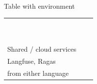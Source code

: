 \begin{simpleCenteringTempChapterTable}{Table with environment}
	\def\cellSharedA{Shared / cloud services}
	\def\cellSharedB{\makecell[l]{OpenAI, Anthropic, Promptfoo, \\ Langfuse, Ragas }}
	\def\cellSharedC{\makecell[l]{Same; consumed via HTTP/SDKs \\  from either language }}

	\begin{tabular}{|l|l|l|} \hline
		\cellLayer 		& \cellPy 			& \cellJs 			\\ \hline
		\cellApiA 		& \cellApiB 		& \cellApiC 		\\ \hline
		\cellDbA 		& \cellDbB 			& \cellDbC 			\\ \hline
		\cellRubricA 	& \cellRubricB 		& \cellRubricC 		\\ \hline
		\cellLlmA 		& \cellLlmB 		& \cellLlmC 		\\ \hline
		\cellStructA 	& \cellStructB 		& \cellStructC 		\\ \hline
		\cellTestA 		& \cellTestB 		& \cellTestC 		\\ \hline
		\cellObsA 		& \cellObsB 		& \cellObsC 		\\ \hline
		\cellMetricA 	& \cellMetricB 		& \cellMetricC 		\\ \hline
		\cellDashboardA & \cellDashboardB 	& \cellDashboardC 	\\ \hline
		\cellUploadA 	& \cellUploadB 		& \cellUploadC 		\\ \hline
		\cellSharedA 	& \cellSharedB 		& \cellSharedC 		\\ \hline
	\end{tabular}
\end{simpleCenteringTempChapterTable}
